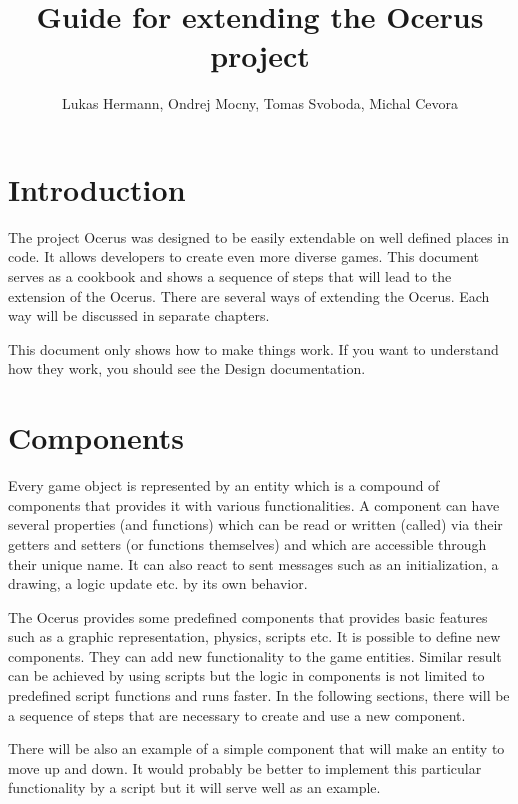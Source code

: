 \documentclass[a4paper, 12pt]{report}
\begin{document}
\pagestyle{empty} %

\title{Guide for extending the Ocerus project}
\author{Lukas Hermann, Ondrej Mocny, Tomas Svoboda, Michal Cevora}

\pagestyle{plain} %

\tableofcontents %
\cleardoublepage %

\chapter{Introduction}

The project Ocerus was designed to be easily extendable on well defined places in code. It allows developers to create even more diverse games. This document serves as a cookbook and shows a sequence of steps that will lead to the extension of the Ocerus. There are several ways of extending the Ocerus. Each way will be discussed in separate chapters.

This document only shows how to make things work. If you want to understand how they work, you should see the Design documentation.

\chapter{Components}

Every game object is represented by an entity which is a compound of components that provides it with various functionalities. A component can have several properties (and functions) which can be read or written (called) via their getters and setters (or functions themselves) and which are accessible through their unique name. It can also react to sent messages such as an initialization, a drawing, a logic update etc. by its own behavior.

The Ocerus provides some predefined components that provides basic features such as a graphic representation,  physics, scripts etc. It is possible to define new components. They can add new functionality to the game entities. Similar result can be achieved by using scripts but the logic in components is not limited to predefined script functions and runs faster. In the following sections, there will be a sequence of steps that are necessary to create and use a new component. 

There will be also an example of a simple component that will make an entity to move up and down. It would probably be better to implement this particular functionality by a script but it will serve well as an example.
\end{document}
